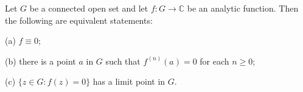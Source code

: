 Let $G$ be a connected open set and let $f: G \to \mathbb{C}$ be an analytic function. Then the following are equivalent statements:

(a) $f \equiv 0$;

(b) there is a point $a$ in $G$ such that $f^{(n)}(a) = 0$ for each $n \geq 0$;

(c) $\{ z \in G : f(z) = 0 \}$ has a limit point in $G$.